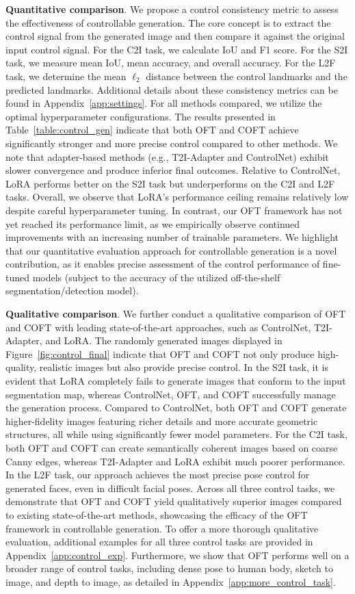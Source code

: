 \textbf{Quantitative comparison}. We propose a control consistency metric to assess the effectiveness of controllable generation. The core concept is to extract the control signal from the generated image and then compare it against the original input control signal. For the C2I task, we calculate IoU and F1 score. For the S2I task, we measure mean IoU, mean accuracy, and overall accuracy. For the L2F task, we determine the mean $\ell_2$ distance between the control landmarks and the predicted landmarks. Additional details about these consistency metrics can be found in Appendix~\ref{app:settings}. For all methods compared, we utilize the optimal hyperparameter configurations. The results presented in Table~\ref{table:control_gen} indicate that both OFT and COFT achieve significantly stronger and more precise control compared to other methods. We note that adapter-based methods (e.g., T2I-Adapter and ControlNet) exhibit slower convergence and produce inferior final outcomes. Relative to ControlNet, LoRA performs better on the S2I task but underperforms on the C2I and L2F tasks. Overall, we observe that LoRA’s performance ceiling remains relatively low despite careful hyperparameter tuning. In contrast, our OFT framework has not yet reached its performance limit, as we empirically observe continued improvements with an increasing number of trainable parameters. We highlight that our quantitative evaluation approach for controllable generation is a novel contribution, as it enables precise assessment of the control performance of fine-tuned models (subject to the accuracy of the utilized off-the-shelf segmentation/detection model).

\textbf{Qualitative comparison}. We further conduct a qualitative comparison of OFT and COFT with leading state-of-the-art approaches, such as ControlNet, T2I-Adapter, and LoRA. The randomly generated images displayed in Figure~\ref{fig:control_final} indicate that OFT and COFT not only produce high-quality, realistic images but also provide precise control. In the S2I task, it is evident that LoRA completely fails to generate images that conform to the input segmentation map, whereas ControlNet, OFT, and COFT successfully manage the generation process. Compared to ControlNet, both OFT and COFT generate higher-fidelity images featuring richer details and more accurate geometric structures, all while using significantly fewer model parameters. For the C2I task, both OFT and COFT can create semantically coherent images based on coarse Canny edges, whereas T2I-Adapter and LoRA exhibit much poorer performance. In the L2F task, our approach achieves the most precise pose control for generated faces, even in difficult facial poses. Across all three control tasks, we demonstrate that OFT and COFT yield qualitatively superior images compared to existing state-of-the-art methods, showcasing the efficacy of the OFT framework in controllable generation. To offer a more thorough qualitative evaluation, additional examples for all three control tasks are provided in Appendix~\ref{app:control_exp}. Furthermore, we show that OFT performs well on a broader range of control tasks, including dense pose to human body, sketch to image, and depth to image, as detailed in Appendix~\ref{app:more_control_task}.

